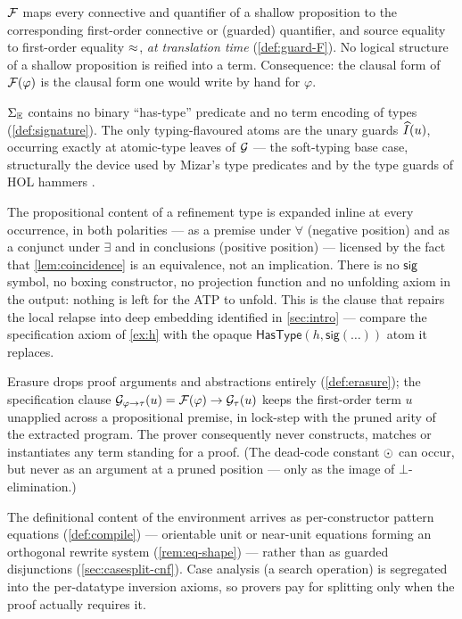 \begin{description}[leftmargin=2em]
\item[S1 (Native logical structure).]  $\mathcal{F}$ maps every connective and
  quantifier of a shallow proposition to the corresponding first-order
  connective or (guarded) quantifier, and source equality to first-order
  equality $\approx$, \emph{at translation time} (\cref{def:guard-F}).  No
  logical structure of a shallow proposition is reified into a term.
  Consequence: the clausal form of $\mathcal{F}(\varphi)$ is the clausal form one
  would write by hand for $\varphi$.

\item[S2 (No inhabitation predicate).]  $\Sigma_{\mathbb{E}}$ contains no binary
  ``has-type'' predicate and no term encoding of types
  (\cref{def:signature}).  The only typing-flavoured atoms are the unary
  guards $\widehat{I}(u)$, occurring exactly at atomic-type leaves of
  $\mathcal{G}$ --- the soft-typing base case, structurally the device used
  by Mizar's type predicates \cite{Wiedijk2007} and by the type guards
  of HOL hammers \cite{MengPaulson2008,BlanchetteEtAl2016}.

\item[S3 (Per-occurrence payload expansion).]  The
  propositional content of a refinement type is expanded inline at every
  occurrence, in both polarities --- as a premise under $\forall$
  (negative position) and as a conjunct under $\exists$ and in
  conclusions (positive position) ---
  licensed by the fact that \cref{lem:coincidence} is an equivalence,
  not an implication.  There is no $\mathsf{sig}$ symbol, no boxing
  constructor, no projection function and no unfolding axiom in the
  output: nothing is left for the ATP to unfold.  This is the clause
  that repairs the local relapse into deep embedding identified in
  \cref{sec:intro} --- compare the specification axiom of \cref{ex:h}
  with the opaque $\mathsf{HasType}(h, \mathsf{sig}(\dots))$ atom it
  replaces.

\item[S4 (Proofs never become terms).]  Erasure drops proof arguments
  and abstractions entirely (\cref{def:erasure}); the specification
  clause $\mathcal{G}_{\varphi \to \tau}(u) = \mathcal{F}(\varphi) \to \mathcal{G}_{\tau}(u)$
  keeps the first-order term $u$ unapplied across a propositional
  premise, in lock-step with the pruned arity of the extracted program.
  The prover consequently never constructs, matches or instantiates any
  term standing for a proof.  (The dead-code constant $\odot$ can occur,
  but never as an argument at a pruned position --- only as the image of
  $\bot$-elimination.)

\item[S5 (Definitions as oriented computation).]  The definitional
  content of the environment arrives as per-constructor pattern
  equations (\cref{def:compile}) --- orientable unit or near-unit
  equations forming an orthogonal rewrite system
  (\cref{rem:eq-shape}) --- rather than as guarded disjunctions
  (\cref{sec:casesplit-cnf}).  Case analysis (a search operation) is
  segregated into the per-datatype inversion axioms, so provers pay for
  splitting only when the proof actually requires it.
\end{description}

